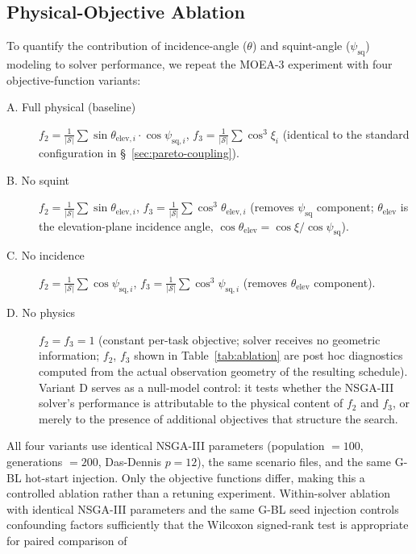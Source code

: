\subsection{Physical-Objective Ablation}
\label{sec:ablation}

To quantify the contribution of incidence-angle ($\theta$) and squint-angle
(${\psi_{\text{sq}}}$) modeling to solver performance, we repeat the MOEA-3
experiment with four objective-function variants:
%
{\sloppy
\begin{description}
\item[A. Full physical (baseline)] $f_2 = \frac{1}{|\mathcal{S}|}\sum \sin\theta_{\text{elev},i} \cdot \cos\psi_{\text{sq},i}$,
      $f_3 = \frac{1}{|\mathcal{S}|}\sum \cos^3\xi_i$ (identical to the
      standard configuration in \S~\ref{sec:pareto-coupling}).
\item[B. No squint] $f_2 = \frac{1}{|\mathcal{S}|}\sum \sin\theta_{\text{elev},i}$,
      $f_3 = \frac{1}{|\mathcal{S}|}\sum \cos^3\theta_{\text{elev},i}$ (removes ${\psi_{\text{sq}}}$ component;
      $\theta_{\text{elev}}$ is the elevation-plane incidence angle, $\cos\theta_{\text{elev}}=\cos\xi/\cos\psi_{\text{sq}}$).
\item[C. No incidence] $f_2 = \frac{1}{|\mathcal{S}|}\sum \cos\psi_{\text{sq},i}$,
      $f_3 = \frac{1}{|\mathcal{S}|}\sum \cos^3\psi_{\text{sq},i}$ (removes $\theta_{\text{elev}}$ component).
\item[D. No physics] $f_2 = f_3 = 1$ (constant per-task objective; solver receives
      no geometric information; $f_2$, $f_3$ shown in Table~\ref{tab:ablation} are post hoc diagnostics
      computed from the actual observation geometry of the resulting schedule).
      Variant D serves as a null-model control: it tests whether the NSGA-III
      solver's performance is attributable to the physical content of $f_2$
      and $f_3$, or merely to the presence of additional objectives that
      structure the search.
\end{description}
}
%
All four variants use identical NSGA-III parameters (population $= 100$,
generations $= 200$, Das-Dennis $p=12$), the same scenario files, and
the same G-BL hot-start injection. Only the objective functions differ,
making this a controlled ablation rather than a retuning experiment.
Within-solver ablation with identical NSGA-III parameters and the same
G-BL seed injection controls confounding factors sufficiently that the
Wilcoxon signed-rank test is appropriate for paired comparison of
